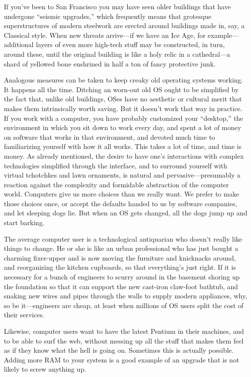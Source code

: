 \documentclass[
  fontsize=11pt,
  paper=landscape,
  twocolumn=true,
  pagesize=pdftex,
  headings=small,
  DIV=15,
  ]{scrartcl}
\begin{document}
If you've been to San Francisco you may have seen older buildings that
have undergone ``seismic upgrades,'' which frequently means that
grotesque superstructures of modern steelwork are erected around
buildings made in, say, a Classical style. When new threats arrive---if
we have an Ice Age, for example---additional layers of even more
high-tech stuff may be constructed, in turn, around these, until the
original building is like a holy relic in a cathedral---a shard of
yellowed bone enshrined in half a ton of fancy protective junk.

Analogous measures can be taken to keep creaky old operating systems
working. It happens all the time. Ditching an worn-out old OS ought to
be simplified by the fact that, unlike old buildings, OSes have no
aesthetic or cultural merit that makes them intrinsically worth saving.
But it doesn't work that way in practice. If you work with a computer,
you have probably customized your ``desktop,'' the environment in which
you sit down to work every day, and spent a lot of money on software
that works in that environment, and devoted much time to familiarizing
yourself with how it all works. This takes a lot of time, and time is
money. As already mentioned, the desire to have one's interactions with
complex technologies simplified through the interface, and to surround
yourself with virtual tchotchkes and lawn ornaments, is natural and
pervasive---presumably a reaction against the complexity and formidable
abstraction of the computer world. Computers give us more choices than
we really want. We prefer to make those choices once, or accept the
defaults handed to us by software companies, and let sleeping dogs lie.
But when an OS gets changed, all the dogs jump up and start barking.

The average computer user is a technological antiquarian who doesn't
really like things to change. He or she is like an urban professional
who has just bought a charming fixer-upper and is now moving the
furniture and knicknacks around, and reorganizing the kitchen cupboards,
so that everything's just right. If it is necessary for a bunch of
engineers to scurry around in the basement shoring up the foundation so
that it can support the new cast-iron claw-foot bathtub, and snaking new
wires and pipes through the walls to supply modern appliances, why, so
be it---engineers are cheap, at least when millions of OS users split
the cost of their services.

Likewise, computer users want to have the latest Pentium in their
machines, and to be able to surf the web, without messing up all the
stuff that makes them feel as if they know what the hell is going on.
Sometimes this is actually possible. Adding more RAM to your system is a
good example of an upgrade that is not likely to screw anything up.
\end{document}
